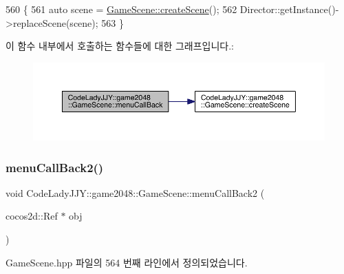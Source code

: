 \begin{DoxyCode}
560                                       \{
561     \textcolor{keyword}{auto} scene = \hyperlink{class_code_lady_j_j_y_1_1game2048_1_1_game_scene_ab573bac307156883fc8c632821b061e4}{GameScene::createScene}();
562     Director::getInstance()->replaceScene(scene);
563 \}
\end{DoxyCode}
이 함수 내부에서 호출하는 함수들에 대한 그래프입니다.\+:
\nopagebreak
\begin{figure}[H]
\begin{center}
\leavevmode
\includegraphics[width=350pt]{d1/d76/class_code_lady_j_j_y_1_1game2048_1_1_game_scene_ac748b7487b72bc4722b7bbdb181e7267_cgraph}
\end{center}
\end{figure}
\mbox{\label{class_code_lady_j_j_y_1_1game2048_1_1_game_scene_a5fb8ef01d49e87cd898f4d9646dd3034}} 
\subsubsection{\texorpdfstring{menu\+Call\+Back2()}{menuCallBack2()}}
{\footnotesize\ttfamily void Code\+Lady\+J\+J\+Y\+::game2048\+::\+Game\+Scene\+::menu\+Call\+Back2 (\begin{DoxyParamCaption}\item[{cocos2d\+::\+Ref $\ast$}]{obj }\end{DoxyParamCaption})\hspace{0.3cm}{\ttfamily [inline]}}



Game\+Scene.\+hpp 파일의 564 번째 라인에서 정의되었습니다.



